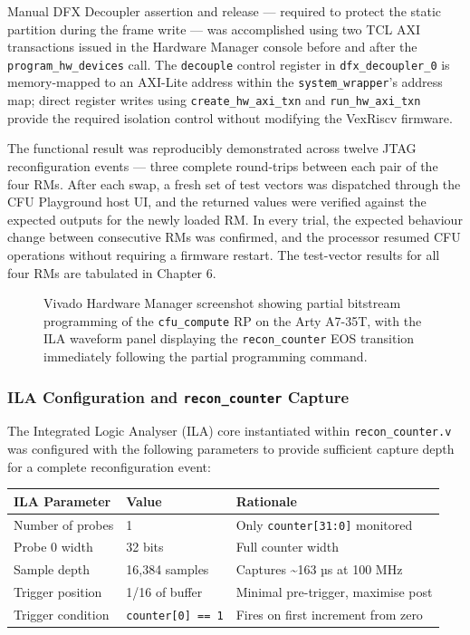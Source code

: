 Manual DFX Decoupler assertion and release — required to protect the static partition during the frame write — was accomplished using two TCL AXI transactions issued in the Hardware Manager console before and after the \texttt{program\_hw\_devices} call. The \texttt{decouple} control register in \texttt{dfx\_decoupler\_0} is memory-mapped to an AXI-Lite address within the \texttt{system\_wrapper}'s address map; direct register writes using \texttt{create\_hw\_axi\_txn} and \texttt{run\_hw\_axi\_txn} provide the required isolation control without modifying the VexRiscv firmware.

The functional result was reproducibly demonstrated across twelve JTAG reconfiguration events — three complete round-trips between each pair of the four RMs. After each swap, a fresh set of test vectors was dispatched through the CFU Playground host UI, and the returned values were verified against the expected outputs for the newly loaded RM. In every trial, the expected behaviour change between consecutive RMs was confirmed, and the processor resumed CFU operations without requiring a firmware restart. The test-vector results for all four RMs are tabulated in Chapter 6.

\begin{figure}[htbp]
\centering
{}
\caption{Vivado Hardware Manager screenshot showing partial bitstream programming of the \texttt{cfu\_compute} RP on the Arty A7-35T, with the ILA waveform panel displaying the \texttt{recon\_counter} EOS transition immediately following the partial programming command.}
\end{figure}

\subsubsection{ILA Configuration and \texttt{recon\_counter} Capture}

The Integrated Logic Analyser (ILA) core instantiated within \texttt{recon\_counter.v} was configured with the following parameters to provide sufficient capture depth for a complete reconfiguration event:

\begin{table}[htbp]
\centering
\begin{tabularx}{\textwidth}{X X X}
\toprule
ILA Parameter & Value & Rationale \\
\midrule
Number of probes & 1 & Only \texttt{counter[31:0]} monitored \\
Probe 0 width & 32 bits & Full counter width \\
Sample depth & 16,384 samples & Captures \textasciitilde{}163 µs at 100 MHz \\
Trigger position & 1/16 of buffer & Minimal pre-trigger, maximise post \\
Trigger condition & \texttt{counter[0] == 1} & Fires on first increment from zero \\
\bottomrule
\end{tabularx}
\end{table}

